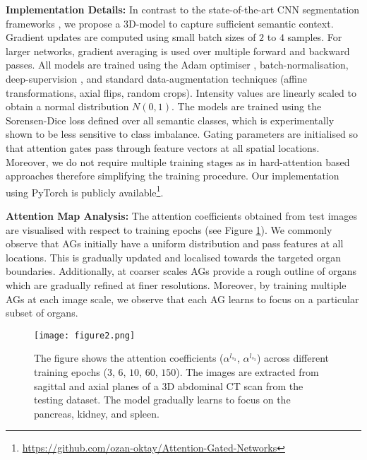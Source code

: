 \documentclass{article}
\begin{document}
\textbf{Implementation Details:} In contrast to the state-of-the-art CNN segmentation frameworks \cite{cai2017improving, roth2018media}, we propose a 3D-model to capture sufficient semantic context. Gradient updates are computed using small batch sizes of $2$ to $4$ samples. For larger networks, gradient averaging is used over multiple forward and backward passes. All models are trained using the Adam optimiser \cite{kingma2014adam}, batch-normalisation, deep-supervision \cite{lee2015deeply}, and standard data-augmentation techniques (affine transformations, axial flips, random crops). Intensity values are linearly scaled to obtain a normal distribution $N(0,1)$. The models are trained using the Sorensen-Dice loss \cite{milletari2016v} defined over all semantic classes, which is experimentally shown to be less sensitive to class imbalance. Gating parameters are initialised so that attention gates pass through feature vectors at all spatial locations. Moreover, we do not require multiple training stages as in hard-attention based approaches therefore simplifying the training procedure. Our implementation using PyTorch is publicly available\footnote{\url{https://github.com/ozan-oktay/Attention-Gated-Networks}}.

\textbf{Attention Map Analysis:} The attention coefficients obtained from test images are visualised with respect to training epochs (see Figure \ref{fig:attentions_vs_epochs}). We commonly observe that AGs initially have a uniform distribution and pass features at all locations. This is gradually updated and localised towards the targeted organ boundaries. Additionally, at coarser scales AGs provide a rough outline of organs which are gradually refined at finer resolutions. Moreover, by training multiple AGs at each image scale, we observe that each AG learns to focus on a particular subset of organs. 

\begin{figure}[!t]
	\centering
	\texttt{[image: figure2.png]}
	\caption{The figure shows the attention coefficients ($\alpha^{l_{s_2}}$, $\alpha^{l_{s_3}}$) across different training epochs ($3$, $6$, $10$, $60$, $150$). The images are extracted from sagittal and axial planes of a 3D abdominal CT scan from the testing dataset. The model gradually learns to focus on the pancreas, kidney, and spleen.}
	\label{fig:attentions_vs_epochs}
\end{figure}
\end{document}
